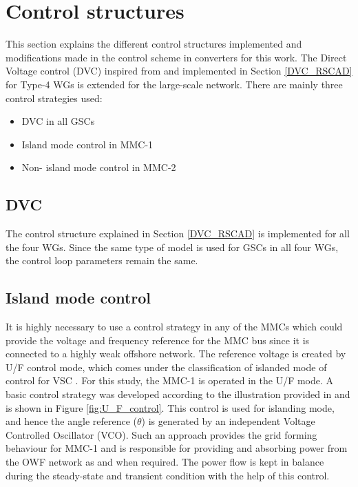\section{Control structures}
This section explains the different control structures implemented and modifications made in the control scheme in converters for this work. The Direct Voltage control (\gls{DVC}) inspired from \cite{erlich_new_2017} and implemented in Section \ref{DVC_RSCAD} for Type-4 \gls{WG}s is extended for the large-scale network. There are mainly three control strategies used:
\begin{itemize}
    \item \gls{DVC} in all \gls{GSC}s
    \item Island mode control in \gls{MMC}-1
    \item Non- island mode control in \gls{MMC}-2
\end{itemize}

\subsection{DVC}
The control structure explained in Section \ref{DVC_RSCAD} is implemented for all the four \gls{WG}s. Since the same type of model is used for \gls{GSC}s in all four \gls{WG}s, the control loop parameters remain the same.

\subsection{Island mode control}
It is highly necessary to use a control strategy in any of the \gls{MMC}s which could provide the voltage and frequency reference for the \gls{MMC} bus since it is connected to a highly weak offshore network. The reference voltage is created by U/F control mode, which comes under the classification of islanded mode of control for \gls{VSC} \cite{vrana2013cigre}. For this study, the \gls{MMC}-1 is operated in the U/F mode. A basic control strategy was developed according to the illustration provided in \cite{wachal2014guide} and is shown in Figure \ref{fig:U_F_control}. This control is used for islanding mode, and hence the angle reference ($\theta$) is generated by an independent Voltage Controlled Oscillator (VCO). Such an approach provides the grid forming behaviour for \gls{MMC}-1 and is responsible for providing and absorbing power from the \gls{OWF} network as and when required. The power flow is kept in balance during the steady-state and transient condition with the help of this control.  

